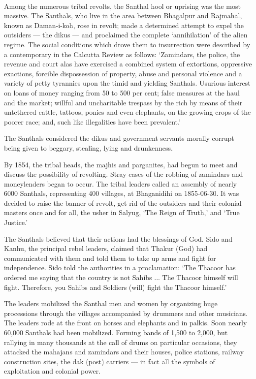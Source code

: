 \paragraph*{}
Among the numerous tribal revolts, the Santhal hool or uprising was the most massive. The Santhals, who live in the area between Bhagalpur and Rajmahal, known as Daman-i-koh, rose in revolt; made a determined attempt to expel the outsiders --- the dikus --- and proclaimed the complete `annihilation' of the alien regime. The social conditions which drove them to insurrection were described by a contemporary in the Calcutta Review as follows: `Zamindars, the police, the revenue and court alas have exercised a combined system of extortions, oppressive exactions, forcible dispossession of property, abuse and personal violence and a variety of petty tyrannies upon the timid and yielding Santhals. Usurious interest on loans of money ranging from 50 to 500 per cent; false measures at the haul and the market; willful and uncharitable trespass by the rich by means of their untethered cattle, tattoos, ponies and even elephants, on the growing crops of the poorer race; and, such like illegalities have been prevalent.'

The Santhals considered the dikus and government servants morally corrupt being given to beggary, stealing, lying and drunkenness.

By 1854, the tribal heads, the majhis and parganites, had begun to meet and discuss the possibility of revolting. Stray cases of the robbing of zamindars and moneylenders began to occur. The tribal leaders called an assembly of nearly 6000 Santhals, representing 400 villages, at Bhaganidihi on 1855-06-30. It was decided to raise the banner of revolt, get rid of the outsiders and their colonial masters once and for all, the usher in Salyug, `The Reign of Truth,' and `True Justice.'

The Santhals believed that their actions had the blessings of God. Sido and Kanhu, the principal rebel leaders, claimed that Thakur (God) had communicated with them and told them to take up arms and fight for independence. Sido told the authorities in a proclamation: `The Thacoor has ordered me saying that the country is not Sahibs ... The Thacoor himself will fight. Therefore, you Sahibs and Soldiers (will) fight the Thacoor himself.'

The leaders mobilized the Santhal men and women by organizing huge processions through the villages accompanied by drummers and other musicians. The leaders rode at the front on horses and elephants and in palkis. Soon nearly 60,000 Santhals had been mobilized. Forming bands of 1,500 to 2,000, but rallying in many thousands at the call of drums on particular occasions, they attacked the mahajans and zamindars and their houses, police stations, railway construction sites, the dak (post) carriers --- in fact all the symbols of exploitation and colonial power.

